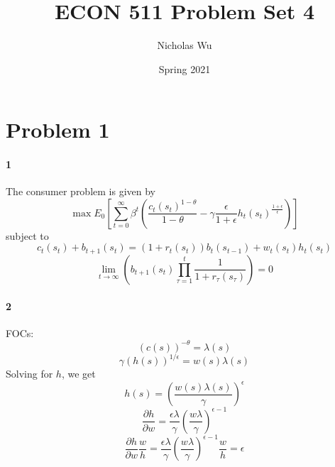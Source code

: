 \documentclass[10pt,letter]{article}
\newcommand{\problem}[1]{\section*{Problem #1}}
\newcommand{\problempart}[1]{\paragraph{#1}}
\begin{document}


\title{ECON 511 Problem Set 4}

\author{Nicholas Wu}

\date{Spring 2021}

\maketitle

\problem{1}
\problempart{1}
The consumer problem is given by
\[ \max E_0 \left[ \sum_{t=0}^\infty \beta^t \left( \frac{c_t(s_t)^{1-\theta}}{1-\theta} - \gamma\frac{\epsilon}{1+\epsilon}h_t(s_t)^{\frac{1+\epsilon}{\epsilon}} \right) \right] \]
subject to
\[ c_t(s_t) + b_{t+1}(s_t) = (1+r_t(s_{t}))b_t(s_{t-1}) + w_t(s_t)h_t(s_t) \]
\[ \lim_{t \to \infty} \left( b_{t+1}(s_t) \prod_{\tau=1}^t \frac{1}{1+r_\tau(s_\tau)} \right) = 0 \]
\problempart{2} FOCs:
\[ (c(s))^{-\theta} = \lambda(s) \]
\[ \gamma (h(s))^{1/\epsilon} = w(s)\lambda(s)\]
Solving for $h$, we get
\[ h(s) = \left( \frac{w(s)\lambda(s)}{\gamma} \right)^\epsilon \]
\[ \frac{\partial h}{\partial w} = \frac{\epsilon\lambda}{\gamma} \left( \frac{w\lambda}{\gamma} \right)^{\epsilon - 1} \]
\[ \frac{\partial h}{\partial w}\frac{w}{h} = \frac{\epsilon\lambda}{\gamma} \left( \frac{w\lambda}{\gamma} \right)^{\epsilon - 1}\frac{w}{h} = \epsilon \]
\end{document}
